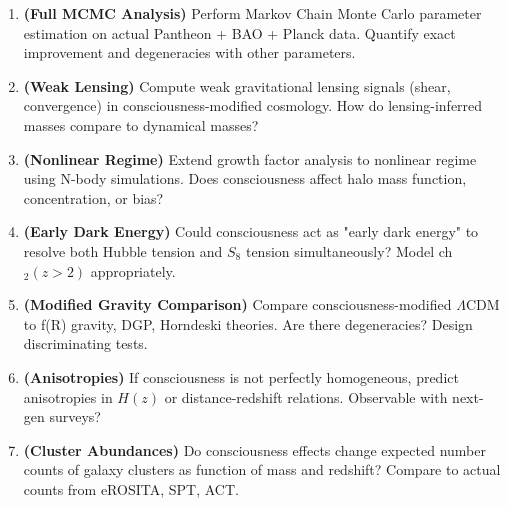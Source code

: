 \begin{enumerate}
\item \textbf{(Full MCMC Analysis)} Perform Markov Chain Monte Carlo parameter estimation on actual Pantheon + BAO + Planck data. Quantify exact improvement and degeneracies with other parameters.

\item \textbf{(Weak Lensing)} Compute weak gravitational lensing signals (shear, convergence) in consciousness-modified cosmology. How do lensing-inferred masses compare to dynamical masses?

\item \textbf{(Nonlinear Regime)} Extend growth factor analysis to nonlinear regime using N-body simulations. Does consciousness affect halo mass function, concentration, or bias?

\item \textbf{(Early Dark Energy)} Could consciousness act as "early dark energy" to resolve both Hubble tension and $S_8$ tension simultaneously? Model ch$_2(z > 2)$ appropriately.

\item \textbf{(Modified Gravity Comparison)} Compare consciousness-modified $\Lambda$CDM to f(R) gravity, DGP, Horndeski theories. Are there degeneracies? Design discriminating tests.

\item \textbf{(Anisotropies)} If consciousness is not perfectly homogeneous, predict anisotropies in $H(z)$ or distance-redshift relations. Observable with next-gen surveys?

\item \textbf{(Cluster Abundances)} Do consciousness effects change expected number counts of galaxy clusters as function of mass and redshift? Compare to actual counts from eROSITA, SPT, ACT.
\end{enumerate}
